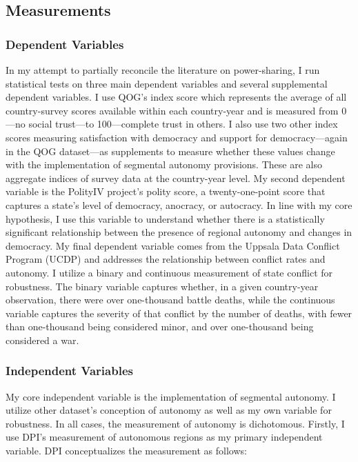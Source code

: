 \documentclass[12pt]{article}
\begin{document}
\subsection{Measurements}
\subsubsection{Dependent Variables} 
In my attempt to partially reconcile the literature on power-sharing, I run statistical tests on three main dependent variables and several supplemental dependent variables. I use QOG’s index score which represents the average of all country-survey scores available within each country-year and is measured from 0---no social trust---to 100---complete trust in others. I also use two other index scores measuring satisfaction with democracy and support for democracy---again in the QOG dataset---as supplements to measure whether these values change with the implementation of segmental autonomy provisions. These are also aggregate indices of survey data at the country-year level. My second dependent variable is the PolityIV project’s polity score, a twenty-one-point score that captures a state’s level of democracy, anocracy, or autocracy. In line with my core hypothesis, I use this variable to understand whether there is a statistically significant relationship between the presence of regional autonomy and changes in democracy. My final dependent variable comes from the Uppsala Data Conflict Program (UCDP) and addresses the relationship between conflict rates and autonomy. I utilize a binary and continuous measurement of state conflict for robustness. The binary variable captures whether, in a given country-year observation, there were over one-thousand battle deaths, while the continuous variable captures the severity of that conflict by the number of deaths, with fewer than one-thousand being considered minor, and over one-thousand being considered a war. 

\subsubsection{Independent Variables} 
My core independent variable is the implementation of segmental autonomy. I utilize other dataset’s conception of autonomy as well as my own variable for robustness. In all cases, the measurement of autonomy is dichotomous. Firstly, I use DPI's measurement of autonomous regions as my primary independent variable. DPI conceptualizes the measurement as follows:
\end{document}
